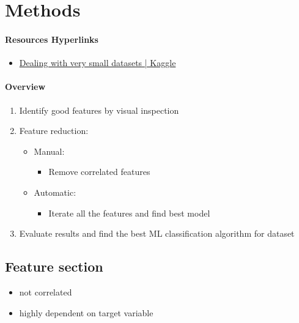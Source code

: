 \section{Methods}
\paragraph{Resources Hyperlinks} 
\begin{itemize}
    \item \href{https://www.kaggle.com/code/rafjaa/dealing-with-very-small-datasets}{Dealing with very small datasets | Kaggle}
    
\end{itemize}




\paragraph{Overview} 
\begin{enumerate}
    \item Identify good features by visual inspection 
    \item Feature reduction:
        \begin{itemize}
            \item Manual:
                \begin{itemize}
                    \item Remove correlated features
                \end{itemize}
                
            \item Automatic:
                \begin{itemize}
                    \item Iterate all the features and find best model 
                \end{itemize}
                
        \end{itemize}
        
    \item Evaluate results and find the best ML classification algorithm for dataset 
    
\end{enumerate}


\subsection{Feature section}
\begin{itemize}
    \item not correlated
    \item highly dependent on target variable 
\end{itemize}





